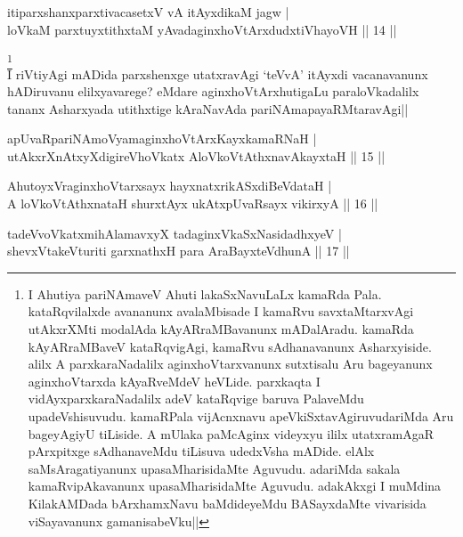 \begin{shl}
itiparxshanxparxtivacasetxV vA itAyxdikaM jagw | \\
loVkaM parxtuyxtithxtaM yAvadaginxhoVtArxdudxtiVhayoVH \hfill|| 14 || 
\end{shl}

\begin{artha}
\footnote[2]{I Ahutiya pariNAmaveV Ahuti lakaSxNavuLaLx kamaRda Pala. 
kataRqvilalxde avananunx avalaMbisade I kamaRvu savxtaMtarxvAgi 
utAkxrXMti modalAda kAyARraMBavanunx mADalAradu. kamaRda kAyARraMBaveV 
kataRqvigAgi, kamaRvu sAdhanavanunx Asharxyiside. alilx A 
parxkaraNadalilx aginxhoVtarxvanunx sutxtisalu Aru bageyanunx 
aginxhoVtarxda kAyaRveMdeV heVLide. parxkaqta I vidAyxparxkaraNadalilx 
adeV kataRqvige baruva PalaveMdu upadeVshisuvudu. kamaRPala 
vijAcnxnavu apeVkiSxtavAgiruvudariMda Aru bageyAgiyU tiLiside. A 
mUlaka paMcAginx videyxyu ililx utatxramAgaR pArxpitxge sAdhanaveMdu 
tiLisuva udedxVsha mADide. elAlx saMsAragatiyanunx upasaMharisidaMte 
Aguvudu. adariMda sakala kamaRvipAkavanunx upasaMharisidaMte Aguvudu. 
adakAkxgi I muMdina KilakAMDada bArxhamxNavu baMdideyeMdu BASayxdaMte 
vivarisida viSayavanunx gamanisabeVku||}\\
I riVtiyAgi mADida parxshenxge utatxravAgi `teVvA' itAyxdi 
vacanavanunx hADiruvanu elilxyavarege? eMdare aginxhoVtArxhutigaLu 
paraloVkadalilx tananx Asharxyada utithxtige kAraNavAda 
pariNAmapayaRMtaravAgi||
\end{artha}

\begin{shl}
apUvaRpariNAmoV\s yamaginxhoVtArxKayxkamaRNaH | \\
utAkxrXnAtxyXdigireVhoVkatx AloVkoVtAthxnavAkayxtaH ||  15 ||  
\end{shl}


\begin{shl}
AhutoyxVraginxhoVtarxsayx hayxnatxrikASxdiBeVdataH | \\
A loVkoVtAthxnataH shurxtAyx ukAtx\s pUvaRsayx vikirxyA ||  16 ||  
\end{shl}


\begin{shl}
tadeVvoVkatxmihA\s \s lamavxyX tadaginxVkaSxNasidadhxyeV | \\
shevxVtakeVturiti garxnathxH para AraBayxteV\s dhunA \hfill|| 17 || 
\end{shl}

